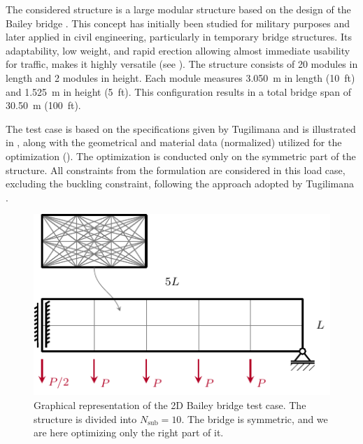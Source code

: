 The considered structure is a large modular structure based on the design of the Bailey bridge . This concept has initially been studied for military purposes and later applied in civil engineering, particularly in temporary bridge structures. Its adaptability, low weight, and rapid erection allowing almost immediate usability for traffic, makes it highly versatile (see ). The structure consists of 20 modules in length and 2 modules in height. Each module measures \qty{3.050}{m} in length (\qty{10}{ft}) and \qty{1.525}{m} in height (\qty{5}{ft}). This configuration results in a total bridge span of \qty{30.50}{m} (\qty{100}{ft}).

The test case is based on the specifications given by Tugilimana \etal {} and is illustrated in , along with the geometrical and material data (normalized) utilized for the optimization (). The optimization is conducted only on the symmetric part of the structure. All constraints from the formulation  are considered in this load case, excluding the buckling constraint, following the approach adopted by Tugilimana \etal.


\begin{figure}
    \centering
    \includegraphics{figures/06_DMO/00_tug_bench_bcs/bcs.pdf}
    \caption{Graphical representation of the 2D Bailey bridge test case. The structure is divided into $N_\text{sub}=10$. The bridge is symmetric, and we are here optimizing only the right part of it.}
    \label{fig:06_tug_bcs}
\end{figure}

